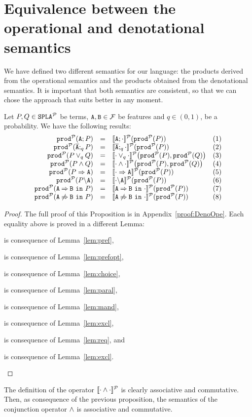 \section{Equivalence between the operational and denotational semantics}\label{sec:equivalenceMain}
We have defined two different semantics for our language:
the products derived from the operational semantics and the products
obtained from the denotational semantics. It is important that
both semantics are consistent, so that we can chose the approach that suits
better in any moment.

\bprop\label{prop:DenoOpe}
  Let $P,Q\in\mathtt{SPLA{^{\cal P}}}$ be terms, $\mathtt{A},\mathtt{B}\in{\cal F}$ be features and $q\in (0,1)$, be a probability. We have the following results:
  $$
  \setcounter{enumi}{0}
  \begin{array}{rlll<{\stepcounter{enumi}(\arabic{enumi})}}
  \prodp(\feature{A};P)&=&\semdenp{\feature{A};\cdot}(\prodp(P)) &\\
  \prodp(\ofeature{A};_qP)&=&\semdenp{\ofeature{A};_q\cdot}(\prodp(P))& \\
  \prodp(P\choice_q Q)&=&\semdenp{\cdot\choice_q\cdot}\bigl(\prodp(P),\prodp(Q)\bigr)& \\
  \prodp(P\paral Q)&=&\semdenp{\cdot\paral\cdot}\bigl(\prodp(P),\prodp(Q)\bigr)& \\
  \prodp(\mandatory{A}{P})&=&\semdenp{\mandatory{A}{\cdot}}(\prodp(P))& \\
  \prodp(\forbid{A}{P})&=&\semdenp{\forbid{A}{\cdot}}(\prodp(P))& \\
  \prodp(\require{A}{B}{P})&=&\semdenp{\require{A}{B}{\cdot}}(\prodp(P))& \\
  \prodp(\exclude{A}{B}{P})&=&\semdenp{\exclude{A}{B}{\cdot}}(\prodp(P)) &
    \end{array}$$
    \begin{proof}
      The full proof of this Proposition is in
      Appendix~\ref{proof:DenoOpe}. Each equality above
      is proved in a different Lemma:
      \begin{enumerate*}[label=(\arabic{enumi})]
      \item is consequence of Lemma~\ref{lem:pref},
      \item is
        consequence of Lemma~\ref{lem:prefopt},
      \item is consequence of
        Lemma~\ref{lem:choice},
      \item is consequence of
        Lemma~\ref{lem:paral},
      \item  is consequence of
        Lemma~\ref{lem:mand},
      \item is consequence of
        Lemma~\ref{lem:excl},
      \item is consequence of
        Lemma~\ref{lem:req}, and
      \item is consequence of
        Lemma~\ref{lem:excl}.
      \end{enumerate*}
    \end{proof}
\eprop
The definition of the operator \([\![\cdot\mathbin{\wedge}\cdot]\!]^{\cal P}\) is
clearly associative and commutative. Then, as consequence of the
previous proposition, the semantics of the
conjunction operator $\mathbin{\wedge}$ is associative and commutative.

